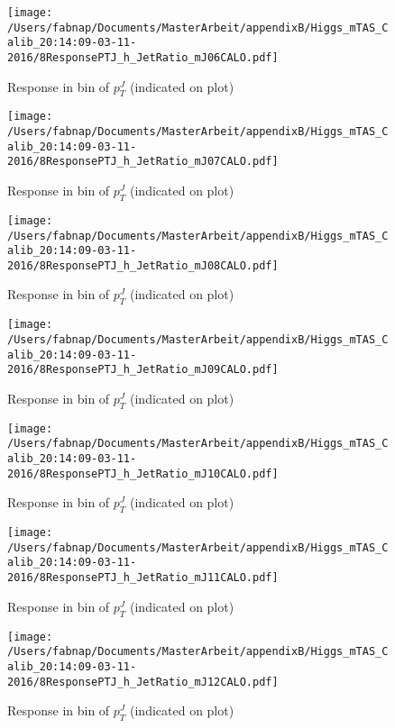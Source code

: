 \begin{figure}

\texttt{[image: /Users/fabnap/Documents/MasterArbeit/appendixB/Higgs\_mTAS\_Calib\_20:14:09-03-11-2016/8ResponsePTJ\_h\_JetRatio\_mJ06CALO.pdf]}
\caption{Response in bin of  $p_{T}^{J}$ (indicated on plot)} 

\end{figure}

%
\begin{figure}

\texttt{[image: /Users/fabnap/Documents/MasterArbeit/appendixB/Higgs\_mTAS\_Calib\_20:14:09-03-11-2016/8ResponsePTJ\_h\_JetRatio\_mJ07CALO.pdf]}
\caption{Response in bin of  $p_{T}^{J}$ (indicated on plot)} 

\end{figure}


\begin{figure}

\texttt{[image: /Users/fabnap/Documents/MasterArbeit/appendixB/Higgs\_mTAS\_Calib\_20:14:09-03-11-2016/8ResponsePTJ\_h\_JetRatio\_mJ08CALO.pdf]}
\caption{Response in bin of  $p_{T}^{J}$ (indicated on plot)} 

\end{figure}

\begin{figure}

\texttt{[image: /Users/fabnap/Documents/MasterArbeit/appendixB/Higgs\_mTAS\_Calib\_20:14:09-03-11-2016/8ResponsePTJ\_h\_JetRatio\_mJ09CALO.pdf]}
\caption{Response in bin of  $p_{T}^{J}$ (indicated on plot)} 

\end{figure}

\begin{figure}

\texttt{[image: /Users/fabnap/Documents/MasterArbeit/appendixB/Higgs\_mTAS\_Calib\_20:14:09-03-11-2016/8ResponsePTJ\_h\_JetRatio\_mJ10CALO.pdf]}
\caption{Response in bin of  $p_{T}^{J}$ (indicated on plot)} 

\end{figure}

\begin{figure}

\texttt{[image: /Users/fabnap/Documents/MasterArbeit/appendixB/Higgs\_mTAS\_Calib\_20:14:09-03-11-2016/8ResponsePTJ\_h\_JetRatio\_mJ11CALO.pdf]}
\caption{Response in bin of  $p_{T}^{J}$ (indicated on plot)} 

\end{figure}

\begin{figure}

\texttt{[image: /Users/fabnap/Documents/MasterArbeit/appendixB/Higgs\_mTAS\_Calib\_20:14:09-03-11-2016/8ResponsePTJ\_h\_JetRatio\_mJ12CALO.pdf]}
\caption{Response in bin of  $p_{T}^{J}$ (indicated on plot)} 

\end{figure}
